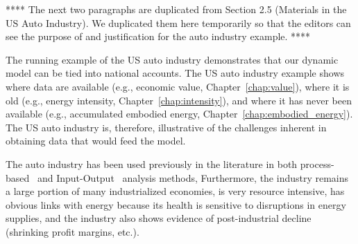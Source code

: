 **** The next two paragraphs are duplicated from 
Section 2.5 (Materials in the US Auto Industry).
We duplicated them here temporarily so that the editors can 
see the purpose of and justification for the auto industry example. ****

The running example of the US auto industry demonstrates that our dynamic model 
can be tied into national accounts.
The US auto industry example shows where data are available 
(e.g., economic value, Chapter~\ref{chap:value}), 
where it is old (e.g., energy intensity, Chapter~\ref{chap:intensity}), 
and where it has never been available 
(e.g., accumulated embodied energy, Chapter~\ref{chap:embodied_energy}).  
The US auto industry is, therefore, 
illustrative of the challenges inherent 
in obtaining data that would feed the model.

The auto industry 
has been used previously
in the literature in both 
process-based~\cite{Berry:1973vo, Sullivan1995, Stodolsky1995, 
							Sullivan1998, McCleese2002, Sullivan2010, Hawkins2012}
and Input-Output~\cite{Bullard:1978vd, MacLean1998, MacLean2003}
analysis methods,
Furthermore, the industry
remains a large portion of many industrialized economies, 
is very resource intensive, 
has obvious links with energy because
its health is sensitive to disruptions in energy supplies, and
the industry also shows evidence of 
post-industrial decline (shrinking profit margins, etc.).







%
%


